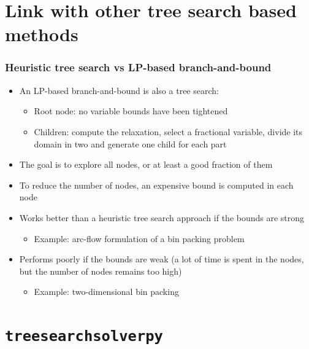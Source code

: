 \documentclass[10pt]{beamer}
\begin{document}
\section{Link with other tree search based methods}

\begin{frame}
  \frametitle{Heuristic tree search vs LP-based branch-and-bound}

  \begin{itemize}
    \pause
    \item An LP-based branch-and-bound is also a tree search:
      \begin{itemize}
        \item Root node: no variable bounds have been tightened
        \item Children: compute the relaxation, select a fractional variable, divide its domain in two and generate one child for each part
      \end{itemize}
    \pause
    \item The goal is to explore all nodes, or at least a good fraction of them
    \pause
    \item To reduce the number of nodes, an expensive bound is computed in each node
    \pause
    \item Works better than a heuristic tree search approach if the bounds are strong
      \begin{itemize}
        \item Example: arc-flow formulation of a bin packing problem
      \end{itemize}
    \pause
    \item Performs poorly if the bounds are weak (a lot of time is spent in the nodes, but the number of nodes remains too high)
      \begin{itemize}
        \item Example: two-dimensional bin packing
      \end{itemize}
  \end{itemize}
\end{frame}


\section{\texttt{treesearchsolverpy}}
\end{document}
